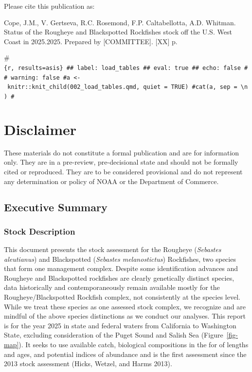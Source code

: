 \documentclass[
]{scrartcl}
\renewcommand*\contentsname{Table of contents}
\newcommand\contentsname{Table of contents}
\begin{document}
\renewcommand*\contentsname{Table of contents}
{
\hypersetup{linkcolor=}
\setcounter{tocdepth}{3}
\tableofcontents
}
\listoffigures
\listoftables

\newpage{}

Please cite this publication as:

Cope, J.M., V. Gertseva, R.C. Rosemond, F.P. Caltabellotta, A.D.
Whitman. Status of the Rougheye and Blackspotted Rockfishes stock off
the U.S. West Coast in 2025.2025. Prepared by {[}COMMITTEE{]}. {[}XX{]}
p.

\newpage{}

\#\texttt{\{r,\ results=\textquotesingle{}asis\textquotesingle{}\}\ \#\#\textbar{}\ label:\ \textquotesingle{}load\_tables\textquotesingle{}\ \#\#\textbar{}\ eval:\ true\ \#\#\textbar{}\ echo:\ false\ \#\#\textbar{}\ warning:\ false\ \#a\ \textless{}-\ knitr::knit\_child(\textquotesingle{}002\_load\_tables.qmd\textquotesingle{},\ quiet\ =\ TRUE)\ \#cat(a,\ sep\ =\ \textquotesingle{}\textbackslash{}n\textquotesingle{})\ \#}

\section*{Disclaimer}\label{disclaimer}

These materials do not constitute a formal publication and are for
information only. They are in a pre-review, pre-decisional state and
should not be formally cited or reproduced. They are to be considered
provisional and do not represent any determination or policy of NOAA or
the Department of Commerce.

\newpage{}

\subsection{Executive Summary}\label{executive-summary}

\subsubsection{Stock Description}\label{stock-description}

This document presents the stock assessment for the Rougheye
(\emph{Sebastes aleutianus}) and Blackspotted (\emph{Sebastes
melanostictus}) Rockfishes, two species that form one management
complex. Despite some identification advances and Rougheye and
Blackspotted rockfishes are clearly genetically distinct species, data
historically and contemporaneously remain available mostly for the
Rougheye/Blackspotted Rockfish complex, not consistently at the species
level. While we treat these species as one assessed stock complex, we
recognize and are mindful of the above species distinctions as we
conduct our analyses. This report is for the year 2025 in state and
federal waters from California to Washington State, excluding
consideration of the Puget Sound and Salish Sea (Figure~\ref{fig-map}).
It seeks to use available catch, biological compositions in the for of
lengths and ages, and potential indices of abundance and is the first
assessment since the 2013 stock assessment (Hicks, Wetzel, and Harms
2013).
\end{document}
